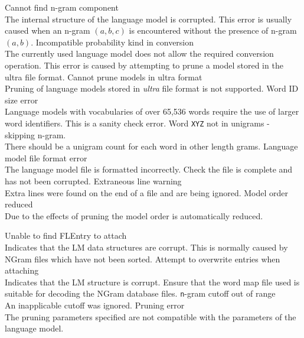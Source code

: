 \begin{itemize}
\begin{itemize}
   Cannot find n-gram component\\
        The internal structure of the language model is corrupted. This error
        is usually caused when an n-gram $(a,b,c)$ is encountered without
        the presence of n-gram $(a,b)$.
   Incompatible probability kind in conversion\\      
        The currently used language model does not allow the required
        conversion operation. This error is caused by attempting to prune a
        model stored in the ultra file format.
   Cannot prune models in ultra format\\
        Pruning of language models stored in {\em ultra} file format is not
        supported.
   Word ID size error\\
        Language models with vocabularies of over 65,536 words require the
        use of larger word identifiers. This is a sanity check error.
   Word \texttt{XYZ} not in unigrams - skipping n-gram.\\
        There should be a unigram count for each word in other length grams.
   Language model file format error\\
        The language model file is formatted incorrectly. Check the file is
        complete and has not been corrupted.
   Extraneous line warning\\
        Extra lines were found on the end of a file and are being ignored.
   Model order reduced\\
        Due to the effects of pruning the model order is automatically reduced.
\end{itemize}



\begin{itemize}
   Unable to find FLEntry to attach\\
        Indicates that the LM data structures are corrupt. This is normally caused
        by NGram files which have not been sorted.
   Attempt to overwrite entries when attaching\\
        Indicates that the LM structure is corrupt. Ensure that the word map file
        used is suitable for decoding the NGram database files.
   \texttt{n}-gram cutoff out of range\\
        An inapplicable cutoff was ignored.
   Pruning error\\
        The pruning parameters specified are not compatible with the parameters 
        of the language model.
\end{itemize}



\end{itemize}
